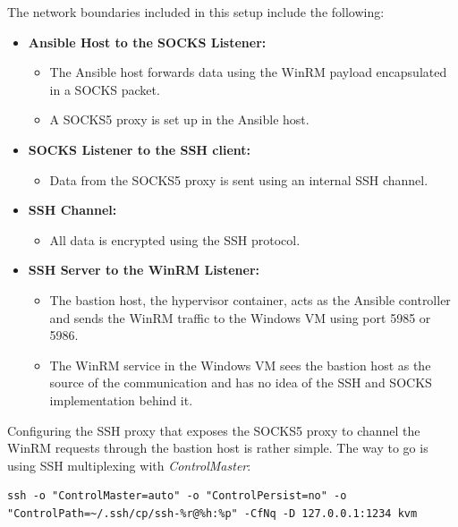 
The network boundaries included in this setup include the following:

\begin{itemize}
    \item \textbf{Ansible Host to the SOCKS Listener:}
        \begin{itemize}
            \item The Ansible host forwards data using the WinRM payload encapsulated in a SOCKS packet.
            \item A SOCKS5 proxy is set up in the Ansible host.
        \end{itemize}
    \item \textbf{SOCKS Listener to the SSH client:}
        \begin{itemize}
            \item Data from the SOCKS5 proxy is sent using an internal SSH channel.
        \end{itemize}
    \item \textbf{SSH Channel:}
        \begin{itemize}
            \item All data is encrypted using the SSH protocol.
        \end{itemize}
    \item \textbf{SSH Server to the WinRM Listener:}
        \begin{itemize}
            \item The bastion host, the hypervisor container, acts as the Ansible controller and sends the WinRM traffic to the Windows VM using port 5985 or 5986.
            \item The WinRM service in the Windows VM sees the bastion host as the source of the communication and has no idea of the SSH and SOCKS implementation behind it.
        \end{itemize}
\end{itemize}

Configuring the SSH proxy that exposes the SOCKS5 proxy to channel the WinRM requests through the bastion host is rather simple. The way to go is using SSH multiplexing with \textit{ControlMaster}:

\begin{lstlisting}[caption=SSH Proxy Exposing SOCKS5 Proxy.,numbers=none,label={lst:ssh_proxy_socks5}]
ssh -o "ControlMaster=auto" -o "ControlPersist=no" -o "ControlPath=~/.ssh/cp/ssh-%r@%h:%p" -CfNq -D 127.0.0.1:1234 kvm
\end{lstlisting}

